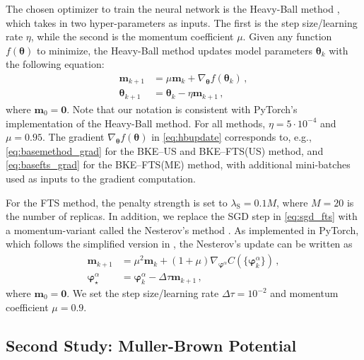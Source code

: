 \documentclass{article}
\numberwithin{equation}{section}
\def\*#1{\mathbf{#1}}
\theoremstyle{definition}
\theoremstyle{remark}
\def\thetab{\boldsymbol{\theta}}
\def\varphib{\boldsymbol{\varphi}}
\begin{document}
The chosen optimizer to train the neural network is the Heavy-Ball method \cite{polyak1964some}, which takes in two hyper-parameters as inputs. 
The first is the step size/learning rate $\eta$, while the second is the momentum coefficient $\mu$. 
Given any function $f(\thetab)$  to minimize, the Heavy-Ball method updates model parameters $\thetab_{k}$ with the following equation:
\begin{align}
    \* m_{k+1} &= \mu \* m_{k}+\nabla_{\thetab} f(\thetab_k) \,, \label{eq:hbupdate} 
\\
    \thetab_{k+1} &= \thetab_k-\eta \* m_{k+1} \,,
\end{align}
where $\* m_0 = \* 0$. 
Note that our notation is consistent with PyTorch's implementation of the Heavy-Ball method. 
For all methods, $\eta = 5 \cdot 10^{-4}$ and $\mu = 0.95$.
The gradient $\nabla_{\thetab} f(\thetab)$ in \cref{eq:hbupdate} corresponds to, e.g., \cref{eq:basemethod_grad} for the BKE--US and BKE--FTS(US) method, and \cref{eq:basefts_grad} for the BKE--FTS(ME) method, with additional mini-batches used as inputs to the gradient computation. 

For the FTS method, the penalty strength is set to $\lambda_\mathrm{S} = 0.1M$, where $M=20$ is the number of replicas. 
In addition, we replace the SGD step in \cref{eq:sgd_fts} with a momentum-variant called the Nesterov's method \cite{nesterov1983method}. 
As implemented in PyTorch, which follows the simplified version in \cite{bengio2013advances}, the Nesterov's update can be written as
\begin{align}
    \* m_{k+1} &= \mu^2 \* m_k +(1+\mu) \nabla_{\varphib^\alpha} \hat{C}(\{ \varphib_{k}^\alpha \}) \,,
\\
    \varphib_{\star}^\alpha &= \varphib_{k}^\alpha - \Delta \tau \* m_{k+1} \,, 
\end{align}
where $\* m_0 = \* 0$. 
We set the step size/learning rate $\Delta \tau= 10^{-2}$ and momentum coefficient $\mu = 0.9$. 

\subsection{Second Study: Muller-Brown Potential} \label{app:optimizer_mb}
\end{document}
